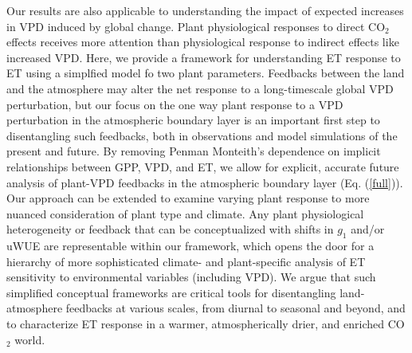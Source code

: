 Our results are also applicable to understanding the impact of
expected increases in VPD induced by global change.  Plant
physiological responses to direct CO$_2$ effects
\citep[e.g.,][]{Swann_2016, Lemordant_2018} receives more attention
than physiological response to indirect effects like increased
VPD. Here, we provide a framework for understanding ET response to ET
using a simplfied model fo two plant parameters. Feedbacks between the
land and the atmosphere may alter the net response to a long-timescale
global VPD perturbation, but our focus on the one way plant response
to a VPD perturbation in the atmospheric boundary layer is an
important first step to disentangling such feedbacks, both in
observations and model simulations of the present and future. By
removing Penman Monteith's dependence on implicit relationships
between GPP, VPD, and ET, we allow for explicit, accurate future
analysis of plant-VPD feedbacks in the atmospheric boundary layer
(Eq. (\ref{full})). Our approach can be extended to examine varying
plant response to more nuanced consideration of plant type and
climate. Any plant physiological heterogeneity or feedback that can be
conceptualized with shifts in $g_1$ \citep[e.g.][]{Lin_2015,
Medlyn_2017} and/or uWUE \citep[e.g.][]{Zhou_2014} are representable
within our framework, which opens the door for a hierarchy of more
sophisticated climate- and plant-specific analysis of ET sensitivity
to environmental variables (including VPD). We argue that such
simplified conceptual frameworks are critical tools for disentangling
land-atmosphere feedbacks at various scales, from diurnal to seasonal
and beyond, and to characterize ET response in a warmer,
atmospherically drier, and enriched CO$_2$ world.
